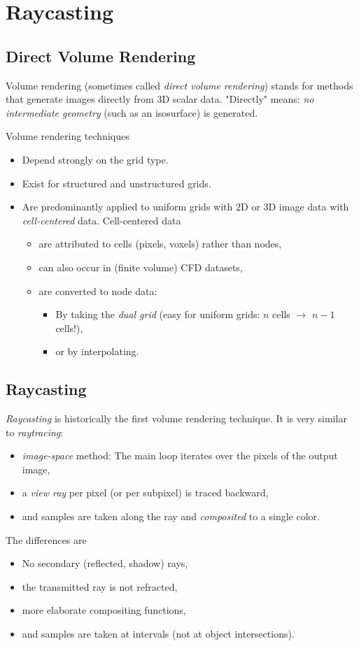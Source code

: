 \section{Raycasting}

\subsection{Direct Volume Rendering}

Volume rendering (sometimes called \emph{direct volume rendering}) stands for methods that generate images directly from $3$D scalar data. "Directly" means: \emph{no intermediate geometry} (such as an isosurface) is 
generated.

Volume rendering techniques
\begin{itemize}
    \item Depend strongly on the grid type.
    \item Exist for structured and unstructured grids.
    \item Are predominantly applied to uniform grids with $2$D or $3$D image data with \emph{cell-centered} data.
    Cell-centered data 
    \begin{itemize}
        \item are attributed to cells (pixels, voxels) rather than nodes,
        \item can also occur in (finite volume) CFD datasets,
        \item are converted to node data:
            \begin{itemize}
                \item By taking the \emph{dual grid} (easy for uniform grids: $n$ cells $\rightarrow$ $n-1$ cells!),
                \item or by interpolating. 
            \end{itemize}
    \end{itemize}
\end{itemize}


\subsection{Raycasting}
\emph{Raycasting} is historically the first volume rendering technique. It is very similar to \emph{raytracing}:
\begin{itemize}
    \item \emph{image-space} method: The main loop iterates over the pixels of the output image,
    \item a \emph{view ray} per pixel (or per subpixel) is traced backward,
    \item and samples are taken along the ray and \emph{composited} to a single color.
\end{itemize}
The differences are
\begin{itemize}
    \item No secondary (reflected, shadow) rays,
    \item the transmitted ray is not refracted,
    \item more elaborate compositing functions,
    \item and samples are taken at intervals (not at object intersections).
\end{itemize}

